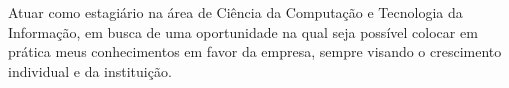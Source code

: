 


\begin{cvparagraph}
Atuar como estagiário na área de Ciência da Computação e Tecnologia da Informação, em busca de uma oportunidade na qual seja possível colocar em prática meus conhecimentos em favor da empresa, sempre visando o crescimento individual e da instituição.
\end{cvparagraph}



